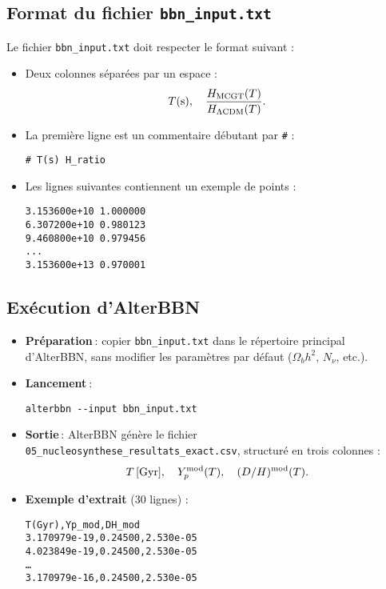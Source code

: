 \subsection{Format du fichier \texttt{bbn\_input.txt}}

Le fichier \texttt{bbn\_input.txt} doit respecter le format suivant :

\begin{itemize}
  \item Deux colonnes séparées par un espace :
    \[
      T(\mathrm{s}),\quad \frac{H_{\rm MCGT}(T)}{H_{\Lambda\mathrm{CDM}}(T)}.
    \]
  \item La première ligne est un commentaire débutant par \texttt{\#} :
    \begin{verbatim}
# T(s) H_ratio
    \end{verbatim}
  \item Les lignes suivantes contiennent un exemple de points :
    \begin{verbatim}
3.153600e+10 1.000000
6.307200e+10 0.980123
9.460800e+10 0.979456
...
3.153600e+13 0.970001
    \end{verbatim}
\end{itemize}

\subsection{Exécution d’AlterBBN}

\begin{itemize}
  \item \textbf{Préparation} :  
    copier \texttt{bbn\_input.txt} dans le répertoire principal d’AlterBBN, sans modifier les paramètres par défaut (\(\Omega_{b}h^{2},\,N_{\nu}\), etc.).
  \item \textbf{Lancement} :
    \begin{verbatim}
alterbbn --input bbn_input.txt
    \end{verbatim}
  \item \textbf{Sortie} :  
  AlterBBN génère le fichier \texttt{05\_nucleosynthese\_resultats\_exact.csv}, structuré en trois colonnes :
  \[
    T\,[\mathrm{Gyr}],\quad Y_{p}^{\rm mod}(T),\quad (D/H)^{\rm mod}(T).
  \]
\item \textbf{Exemple d’extrait} (30 lignes) :
  \begin{verbatim}
T(Gyr),Yp_mod,DH_mod
3.170979e-19,0.24500,2.530e-05
4.023849e-19,0.24500,2.530e-05
…
3.170979e-16,0.24500,2.530e-05
  \end{verbatim}
\end{itemize}

